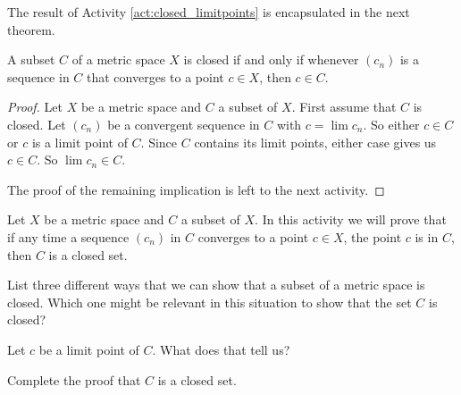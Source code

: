 \begin{comment}

\ActivitySolution

\ba
\item The sequence $(a_n)$ converges to $0$.

\item Since $0 \notin A$, even though $(a_n)$ is in $A$ and converges, the sequence $(a_n)$ does not converge to a point in $A$.  

\item Since $0 \in B$, the sequence $(a_n)$ converges to a point in $B$. 

\item One reason for this behavior is that $B$ is closed and $A$ is not. That is, $B$ contains all of its limit points but $A$ does not. 

\ea

\end{comment}

The result of Activity \ref{act:closed_limitpoints} is encapsulated in the next theorem.

\begin{theorem} \label{thm:Closed_convergent} A subset $C$ of a metric space $X$ is closed if and only if whenever $(c_n)$ is a sequence in $C$ that converges to a point $c \in X$, then $c \in C$. 
\end{theorem}

\begin{proof} Let $X$ be a metric space and $C$ a subset of $X$. First assume that $C$ is closed. Let $(c_n)$ be a convergent sequence in $C$ with $c = \lim c_n$. So either $c \in C$ or $c$ is a limit point of $C$. Since $C$ contains its limit points, either case gives us $c \in C$. So $\lim c_n \in C$. 

The proof of the remaining implication is left to the next activity.

\end{proof}

\begin{activity} Let $X$ be a metric space and $C$ a subset of $X$. In this activity we will prove that if any time a sequence $(c_n)$ in $C$ converges to a point $c \in X$, the point $c$ is in $C$, then $C$ is a closed set. 
\ba
\item List three different ways that we can show that a subset of a metric space is closed. Which one might be relevant in this situation to show that the set $C$ is closed? 

\item Let $c$ be a limit point of $C$. What does that tell us? 

\item Complete the proof that $C$ is a closed set. 


\ea

\end{activity}

